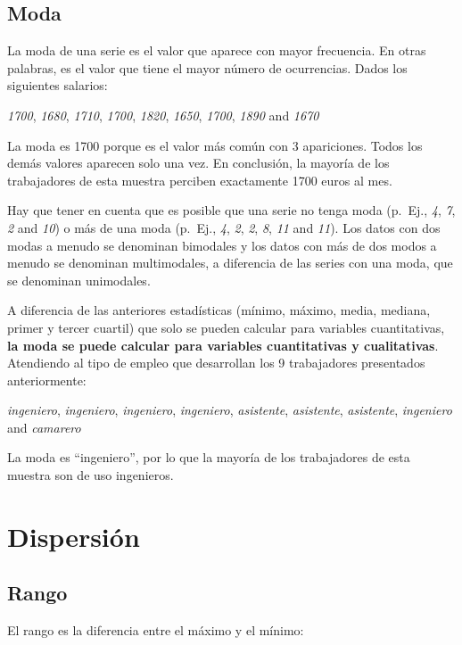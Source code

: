 \documentclass[
]{book}
\begin{document}
\hypertarget{moda}{%
\subsection{Moda}\label{moda}}

La moda de una serie es el valor que aparece con mayor frecuencia. En otras palabras, es el valor que tiene el mayor número de ocurrencias. Dados los siguientes salarios:

\emph{1700}, \emph{1680}, \emph{1710}, \emph{1700}, \emph{1820}, \emph{1650}, \emph{1700}, \emph{1890} and \emph{1670}

La moda es 1700 porque es el valor más común con 3 apariciones. Todos los demás valores aparecen solo una vez. En conclusión, la mayoría de los trabajadores de esta muestra perciben exactamente 1700 euros al mes.

Hay que tener en cuenta que es posible que una serie no tenga moda (p.~Ej., \emph{4}, \emph{7}, \emph{2} and \emph{10}) o más de una moda (p.~Ej., \emph{4}, \emph{2}, \emph{2}, \emph{8}, \emph{11} and \emph{11}). Los datos con dos modas a menudo se denominan bimodales y los datos con más de dos modos a menudo se denominan multimodales, a diferencia de las series con una moda, que se denominan unimodales.

A diferencia de las anteriores estadísticas (mínimo, máximo, media, mediana, primer y tercer cuartil) que solo se pueden calcular para variables cuantitativas, \textbf{la moda se puede calcular para variables cuantitativas y cualitativas}. Atendiendo al tipo de empleo que desarrollan los 9 trabajadores presentados anteriormente:

\emph{ingeniero}, \emph{ingeniero}, \emph{ingeniero}, \emph{ingeniero}, \emph{asistente}, \emph{asistente}, \emph{asistente}, \emph{ingeniero} and \emph{camarero}

La moda es ``ingeniero'', por lo que la mayoría de los trabajadores de esta muestra son de uso ingenieros.

\hypertarget{dispersiuxf3n}{%
\section{Dispersión}\label{dispersiuxf3n}}

\hypertarget{rango}{%
\subsection{Rango}\label{rango}}

El rango es la diferencia entre el máximo y el mínimo:
\end{document}
